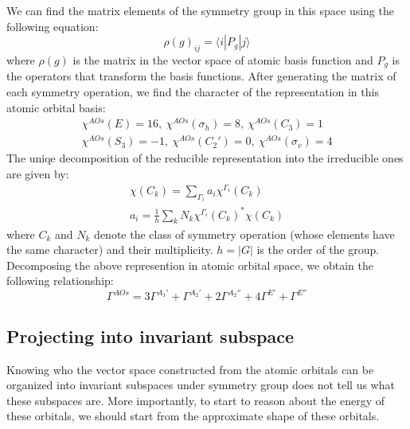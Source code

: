 \documentclass{article}
\begin{document}
We can find the matrix elements of the symmetry group in this space using the following equation:
\begin{equation}
    \rho(g)_{ij} = \langle i | P_g | j \rangle
\end{equation}
where $\rho(g)$ is the matrix in the vector space of atomic basis function and $P_g$ is the 
operators that transform the basis functions. 
After generating the matrix of each symmetry operation, we find the character of the representation
in this atomic orbital basis:
\begin{gather*}
    \chi^{AOs}(E) = 16,\ \chi^{AOs}(\sigma_h) = 8,\ \chi^{AOs}(C_3) = 1\\ 
    \chi^{AOs}(S_3) = -1,\ \chi^{AOs}(C_2') = 0,\ \chi^{AOs}(\sigma_v) = 4
\end{gather*}
The uniqe decomposition of the reducible representation into the irreducible ones are given by:
\begin{gather}
    \chi(C_k) = \sum_{\Gamma_i} a_i \chi^{\Gamma_i}(C_k) \\
    a_i = \frac{1}{h} \sum_{k} N_k \chi^{\Gamma_i}(C_k)^* \chi(C_k)
\end{gather}
where $C_k$ and $N_k$ denote the class of symmetry operation (whose elements have the same character)
and their multiplicity. $h = |G|$ is the order of the group. Decomposing the 
above represention in atomic orbital space, we obtain the following relationship:
\begin{equation}
    \Gamma^{AOs} = 
      3\Gamma^{A_1'} + \Gamma^{A_2'}  + 2\Gamma^{A_2''} + 4\Gamma^{E'} + \Gamma^{E''}
\end{equation}

\subsection{Projecting into invariant subspace}
Knowing who the vector space constructed from the atomic orbitals can be organized into invariant subspaces 
under symmetry group does not tell us what these subspaces are. 
More importantly, to start to reason about the energy of these orbitals, we should start from the approximate
shape of these orbitals.
\end{document}
